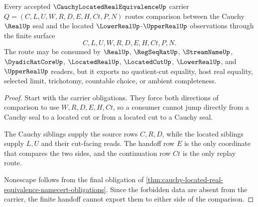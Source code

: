 \begin{theorem}
\label{thm:cauchy-located-real-equivalence-finite-handoff}
Every accepted $\CauchyLocatedRealEquivalenceUp$ carrier $Q=(C,L,U,W,R,D,E,H,Ct,P,N)$ routes comparison between the Cauchy $\RealUp$ seal and the located $\LowerRealUp$-$\UpperRealUp$ observations through the finite surface
$$
C,L,U,W,R,D,E,H,Ct,P,N .
$$
The route may be consumed by $\RealUp$, $\RegSeqRatUp$, $\StreamNameUp$, $\DyadicRatCoreUp$, $\LocatedRealUp$, $\LocatedCutUp$, $\LowerRealUp$, and $\UpperRealUp$ readers, but it exports no quotient-cut equality, host real equality, selected limit, trichotomy, countable choice, or ambient completeness.
\end{theorem}
\begin{proof}
Start with the carrier obligations. They force both directions of comparison to use $W,R,D,E,H,Ct$, so a consumer cannot jump directly from a Cauchy seal to a located cut or from a located cut to a Cauchy seal.

The Cauchy siblings supply the source rows $C,R,D$, while the located siblings supply $L,U$ and their cut-facing reads. The handoff row $E$ is the only coordinate that compares the two sides, and the continuation row $Ct$ is the only replay route.

Nonescape follows from the final obligation of \autoref{thm:cauchy-located-real-equivalence-namecert-obligations}. Since the forbidden data are absent from the carrier, the finite handoff cannot export them to either side of the comparison.
\end{proof}

\begin{closurestatus}{\CauchyLocatedRealEquivalenceUp}
  \theoryclosure{\seedClosure}
  \formalstatus{\unformalizedV}
\end{closurestatus}
